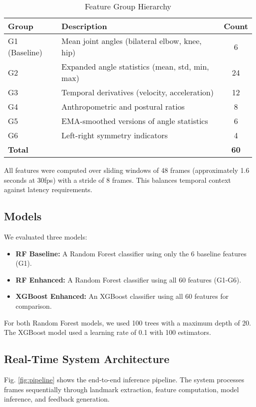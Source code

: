 \documentclass[conference]{IEEEtran}
\begin{document}
\begin{table}[ht]
\caption{Feature Group Hierarchy}
\label{tab:features}
\centering
\begin{tabular}{llc}
\toprule
\textbf{Group} & \textbf{Description} & \textbf{Count} \\
\midrule
G1 (Baseline) & Mean joint angles (bilateral elbow, knee, hip) & 6 \\
G2 & Expanded angle statistics (mean, std, min, max) & 24 \\
G3 & Temporal derivatives (velocity, acceleration) & 12 \\
G4 & Anthropometric and postural ratios & 8 \\
G5 & EMA-smoothed versions of angle statistics & 6 \\
G6 & Left-right symmetry indicators & 4 \\
\midrule
\textbf{Total} & & \textbf{60} \\
\bottomrule
\end{tabular}
\end{table}

All features were computed over sliding windows of 48 frames (approximately 1.6 seconds at 30fps) with a stride of 8 frames. This balances temporal context against latency requirements.

\subsection{Models}
We evaluated three models:
\begin{itemize}
    \item \textbf{RF Baseline:} A Random Forest classifier using only the 6 baseline features (G1).
    \item \textbf{RF Enhanced:} A Random Forest classifier using all 60 features (G1-G6).
    \item \textbf{XGBoost Enhanced:} An XGBoost classifier using all 60 features for comparison.
\end{itemize}

For both Random Forest models, we used 100 trees with a maximum depth of 20. The XGBoost model used a learning rate of 0.1 with 100 estimators.

\subsection{Real-Time System Architecture}
Fig. \ref{fig:pipeline} shows the end-to-end inference pipeline. The system processes frames sequentially through landmark extraction, feature computation, model inference, and feedback generation.
\end{document}

